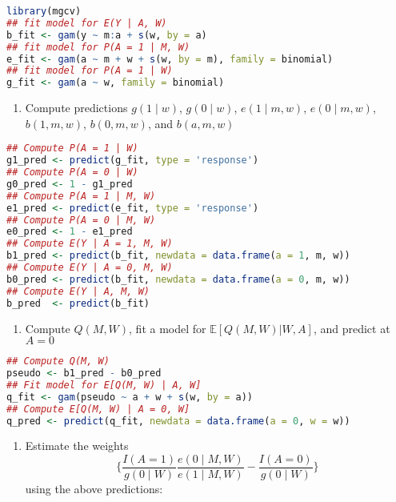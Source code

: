 \documentclass[
  12pt,
]{book}
\providecommand{\tightlist}{%
  \setlength{\itemsep}{0pt}\setlength{\parskip}{0pt}}
\theoremstyle{definition}
\theoremstyle{definition}
\theoremstyle{definition}
\newcommand{\E}{\mathbb{E}}
\newcommand{\1}{\mathbbm{1}}
\begin{document}
\begin{lstlisting}[language=R]
library(mgcv)
## fit model for E(Y | A, W)
b_fit <- gam(y ~ m:a + s(w, by = a)
## fit model for P(A = 1 | M, W)
e_fit <- gam(a ~ m + w + s(w, by = m), family = binomial)
## fit model for P(A = 1 | W)
g_fit <- gam(a ~ w, family = binomial)
\end{lstlisting}

\begin{enumerate}
\def\labelenumi{\arabic{enumi}.}
\setcounter{enumi}{1}
\tightlist
\item
  Compute predictions \(g(1\mid w)\), \(g(0\mid w)\), \(e(1\mid m, w)\),
  \(e(0\mid m, w)\),\(b(1, m, w)\), \(b(0, m, w)\), and \(b(a, m, w)\)
\end{enumerate}

\begin{lstlisting}[language=R]
## Compute P(A = 1 | W)
g1_pred <- predict(g_fit, type = 'response')
## Compute P(A = 0 | W)
g0_pred <- 1 - g1_pred
## Compute P(A = 1 | M, W)
e1_pred <- predict(e_fit, type = 'response')
## Compute P(A = 0 | M, W)
e0_pred <- 1 - e1_pred
## Compute E(Y | A = 1, M, W)
b1_pred <- predict(b_fit, newdata = data.frame(a = 1, m, w))
## Compute E(Y | A = 0, M, W)
b0_pred <- predict(b_fit, newdata = data.frame(a = 0, m, w))
## Compute E(Y | A, M, W)
b_pred  <- predict(b_fit)
\end{lstlisting}

\begin{enumerate}
\def\labelenumi{\arabic{enumi}.}
\setcounter{enumi}{2}
\tightlist
\item
  Compute \(Q(M, W)\), fit a model for \(\E[Q(M,W) | W,A]\), and predict at \(A=0\)
\end{enumerate}

\begin{lstlisting}[language=R]
## Compute Q(M, W)
pseudo <- b1_pred - b0_pred
## Fit model for E[Q(M, W) | A, W]
q_fit <- gam(pseudo ~ a + w + s(w, by = a))
## Compute E[Q(M, W) | A = 0, W]
q_pred <- predict(q_fit, newdata = data.frame(a = 0, w = w))
\end{lstlisting}

\begin{enumerate}
\def\labelenumi{\arabic{enumi}.}
\setcounter{enumi}{3}
\tightlist
\item
  Estimate the weights
  \begin{equation*}
    \bigg\{ \frac{I(A=1)}{g(0\mid W)}\frac{e(0\mid M,W)}{e(1\mid M,W)} -
     \frac{I(A=0)}{g(0\mid W)}\bigg\}
    \end{equation*}
  using the above predictions:
\end{enumerate}
\end{document}
